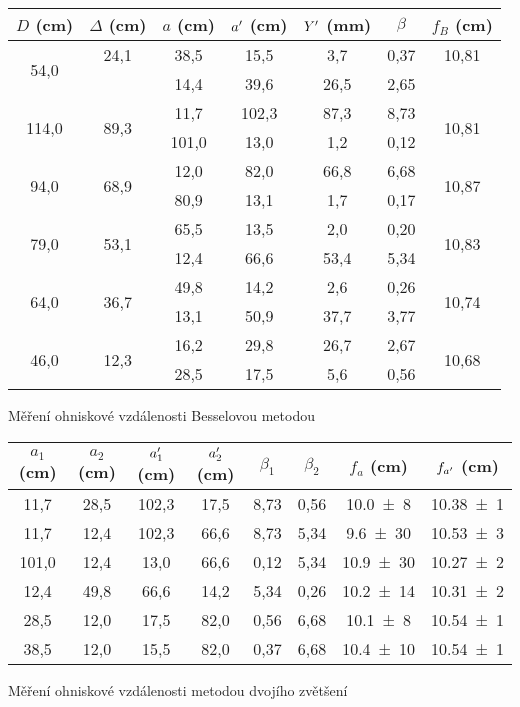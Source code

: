 \begin{tabulka}[htbp]
\centering
\begin{tabular}{cc|cccc|c}
$D$ (\si{\cm}) & $\Delta$ (\si{\cm}) & $a$ (\si{\cm}) & $a^\prime$ (\si{\cm}) & $Y^\prime$ (\si{\mm}) & $ \beta$ & $f_B$ (\si{\cm}) \\ \hline \hline
\multirow{2}{*}{54,0} & 24,1 & 38,5 & 15,5 & 3,7 & 0,37 & 10,81 \\ 
 &  & 14,4 & 39,6 & 26,5 & 2,65 &  \\ \hline
\multirow{2}{*}{114,0} & \multirow{2}{*}{89,3} & 11,7 & 102,3 & 87,3 & 8,73 & \multirow{2}{*}{10,81} \\ 
 &  & 101,0 & 13,0 & 1,2 & 0,12 &  \\ \hline
\multirow{2}{*}{94,0} & \multirow{2}{*}{68,9} & 12,0 & 82,0 & 66,8 & 6,68 & \multirow{2}{*}{10,87} \\ 
 &  & 80,9 & 13,1 & 1,7 & 0,17 &  \\ \hline
\multirow{2}{*}{79,0} & \multirow{2}{*}{53,1} & 65,5 & 13,5 & 2,0 & 0,20 & \multirow{2}{*}{10,83} \\ 
 &  & 12,4 & 66,6 & 53,4 & 5,34 &  \\ \hline
\multirow{2}{*}{64,0} & \multirow{2}{*}{36,7} & 49,8 & 14,2 & 2,6 & 0,26 & \multirow{2}{*}{10,74} \\ 
 &  & 13,1 & 50,9 & 37,7 & 3,77 &  \\ \hline
\multirow{2}{*}{46,0} & \multirow{2}{*}{12,3} & 16,2 & 29,8 & 26,7 & 2,67 & \multirow{2}{*}{10,68} \\ 
 &  & 28,5 & 17,5 & 5,6 & 0,56 &  \\ 
\end{tabular}
\caption{Měření ohniskové vzdálenosti Besselovou metodou}
\label{t:oh}
\end{tabulka}

\begin{tabulka}[htbp]
\centering
\begin{tabular}{cc|cc|cc|cc}
$a_1$ (\si{\cm}) & $a_2$ (\si{\cm}) & $a^\prime_1$ (\si{\cm}) & $a^\prime_2$ (\si{\cm}) & $\beta_1$ & $\beta_2$ & $f_{a}$ (\si{\cm}) & $f_{a^\prime}$ (\si{\cm}) \\ \hline
11,7 & 28,5 & 102,3 & 17,5 & 8,73 & 0,56 & \num{10,0(8)} & \num{10,38(1)} \\ 
11,7 & 12,4 & 102,3 & 66,6 & 8,73 & 5,34 & \num{9,6(30)} & \num{10,53(3)} \\ 
101,0 & 12,4 & 13,0 & 66,6 & 0,12 & 5,34 & \num{10,9(30)} & \num{10,27(2)} \\ 
12,4 & 49,8 & 66,6 & 14,2 & 5,34 & 0,26 & \num{10,2(14)} & \num{10,31(2)} \\ 
28,5 & 12,0 & 17,5 & 82,0 & 0,56 & 6,68 & \num{10,1(8)} & \num{10,54(1)} \\ 
38,5 & 12,0 & 15,5 & 82,0 & 0,37 & 6,68 & \num{10,4(10)} & \num{10,54(1)} \\ 
\end{tabular}
\caption{Měření ohniskové vzdálenosti metodou dvojího zvětšení}
\label{t:dvoji}
\end{tabulka}






